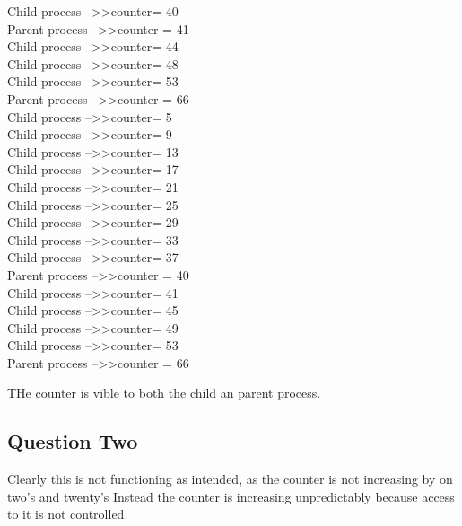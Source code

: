 \documentclass[12pt, titlepage]{article}
\begin{document}
\begin{center}
Child process --\textgreater\textgreater counter= 40\\
Parent process --\textgreater\textgreater counter = 41\\
Child process --\textgreater\textgreater counter= 44\\
Child process --\textgreater\textgreater counter= 48\\
Child process --\textgreater\textgreater counter= 53\\
Parent process --\textgreater\textgreater counter = 66\\
Child process --\textgreater\textgreater counter= 5\\
Child process --\textgreater\textgreater counter= 9\\
Child process --\textgreater\textgreater counter= 13\\
Child process --\textgreater\textgreater counter= 17\\
Child process --\textgreater\textgreater counter= 21\\
Child process --\textgreater\textgreater counter= 25\\
Child process --\textgreater\textgreater counter= 29\\
Child process --\textgreater\textgreater counter= 33\\
Child process --\textgreater\textgreater counter= 37\\
Parent process --\textgreater\textgreater counter = 40\\
Child process --\textgreater\textgreater counter= 41\\
Child process --\textgreater\textgreater counter= 45\\
Child process --\textgreater\textgreater counter= 49\\
Child process --\textgreater\textgreater counter= 53\\
Parent process --\textgreater\textgreater counter = 66\\
\end{center}
\par{}
THe counter is vible to both the child an parent process.
\subsection*{Question Two}
\par{}
Clearly this is not functioning as intended, as the counter
is not increasing by on two's and twenty's
Instead the counter is increasing unpredictably because 
access to it is not controlled.
\end{document}
